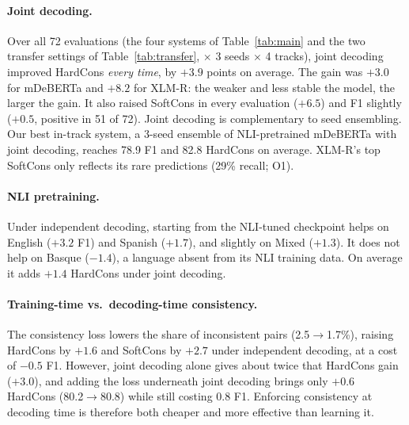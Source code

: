 \paragraph{Joint decoding.} Over all 72 evaluations (the four systems of Table~\ref{tab:main} and the two transfer settings of Table~\ref{tab:transfer}, $\times$ 3 seeds $\times$ 4 tracks), joint decoding improved HardCons \emph{every time}, by $+3.9$ points on average. The gain was $+3.0$ for mDeBERTa and $+8.2$ for XLM-R: the weaker and less stable the model, the larger the gain. It also raised SoftCons in every evaluation ($+6.5$) and F1 slightly ($+0.5$, positive in 51 of 72). Joint decoding is complementary to seed ensembling. Our best in-track system, a 3-seed ensemble of NLI-pretrained mDeBERTa with joint decoding, reaches 78.9 F1 and 82.8 HardCons on average. XLM-R's top SoftCons only reflects its rare \NO predictions (29\% recall; O1).

\paragraph{NLI pretraining.} Under independent decoding, starting from the NLI-tuned checkpoint helps on English ($+3.2$ F1) and Spanish ($+1.7$), and slightly on Mixed ($+1.3$). It does not help on Basque ($-1.4$), a language absent from its NLI training data. On average it adds $+1.4$ HardCons under joint decoding.

\paragraph{Training-time vs.\ decoding-time consistency.} The consistency loss lowers the share of inconsistent pairs (2.5$\rightarrow$1.7\%), raising HardCons by $+1.6$ and SoftCons by $+2.7$ under independent decoding, at a cost of $-0.5$ F1. However, joint decoding alone gives about twice that HardCons gain ($+3.0$), and adding the loss underneath joint decoding brings only $+0.6$ HardCons (80.2$\rightarrow$80.8) while still costing 0.8 F1. Enforcing consistency at decoding time is therefore both cheaper and more effective than learning it.



